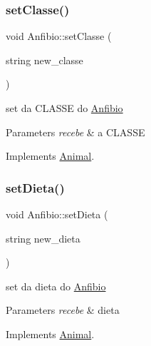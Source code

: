 \mbox{\label{class_anfibio_a7bc9968ef3513b1ecb09a16297be0c9a}} 
\subsubsection{\texorpdfstring{setClasse()}{setClasse()}}
{\footnotesize\ttfamily void Anfibio\+::set\+Classe (\begin{DoxyParamCaption}\item[{string}]{new\+\_\+classe }\end{DoxyParamCaption})\hspace{0.3cm}{\ttfamily [virtual]}}



set da C\+L\+A\+S\+SE do \mbox{\hyperlink{class_anfibio}{Anfibio}} 


\begin{DoxyParams}{Parameters}
{\em recebe} & a C\+L\+A\+S\+SE \\
\hline
\end{DoxyParams}


Implements \mbox{\hyperlink{class_animal}{Animal}}.

\mbox{\label{class_anfibio_aedba3c7a41c0a4410cde4d513973256e}} 
\subsubsection{\texorpdfstring{setDieta()}{setDieta()}}
{\footnotesize\ttfamily void Anfibio\+::set\+Dieta (\begin{DoxyParamCaption}\item[{string}]{new\+\_\+dieta }\end{DoxyParamCaption})\hspace{0.3cm}{\ttfamily [virtual]}}



set da dieta do \mbox{\hyperlink{class_anfibio}{Anfibio}} 


\begin{DoxyParams}{Parameters}
{\em recebe} & dieta \\
\hline
\end{DoxyParams}


Implements \mbox{\hyperlink{class_animal}{Animal}}.

\mbox{\label{class_anfibio_a2341cd74a2afd9e5e646a4a7541a912a}} 
